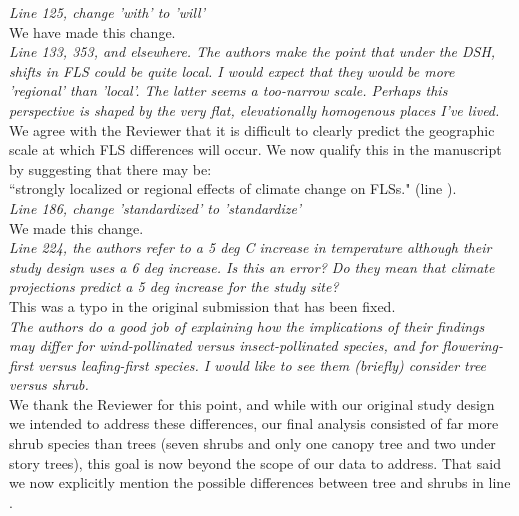 \documentclass[11pt]{article}
\begin{document}
\emph{Line 125, change 'with' to 'will'}\\

We have made this change.\\


\emph{Line 133, 353, and elsewhere. The authors make the point that under the DSH, shifts in FLS could be quite local. I would expect that they would be more 'regional' than 'local'. The latter seems a too-narrow scale. Perhaps this perspective is shaped by the very flat, elevationally homogenous places I've lived.}\\

We agree with the Reviewer that it is difficult to clearly predict the geographic scale at which FLS differences will occur. We now qualify this in the manuscript by suggesting that there may be:\\

``strongly localized or regional effects of climate change on FLSs." (line ).\\

\emph{Line 186, change 'standardized' to 'standardize'}\\

We made this change.\\


\emph{Line 224, the authors refer to a 5 deg C increase in temperature although their study design uses a 6 deg increase. Is this an error? Do they mean that climate projections predict a 5 deg increase for the study site?}\\

This was a typo in the original submission that has been fixed.\\

\emph{The authors do a good job of explaining how the implications of their findings may differ for wind-pollinated versus insect-pollinated species, and for flowering-first versus leafing-first species. I would like to see them (briefly) consider tree versus shrub.}\\

We thank the Reviewer for this point, and while with our original study design we intended to address these differences, our final analysis consisted of far more shrub species than trees (seven shrubs and only one canopy tree and two under story trees), this goal is now beyond the scope of our data to address. That said we now explicitly mention the possible differences between tree and shrubs in line . \\
\end{document}

